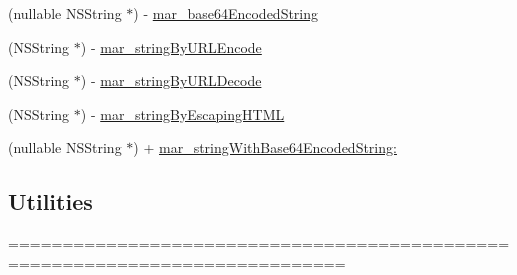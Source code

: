 \begin{DoxyCompactItemize}
\item 
(nullable N\+S\+String $\ast$) -\/ \hyperlink{category_n_s_string_07_m_a_r_e_x_08_ab6af857a6d843090e7fe95b5102111cb}{mar\+\_\+base64\+Encoded\+String}
\item 
(N\+S\+String $\ast$) -\/ \hyperlink{category_n_s_string_07_m_a_r_e_x_08_a6c03a4e04450369c3359a28e22e09019}{mar\+\_\+string\+By\+U\+R\+L\+Encode}
\item 
(N\+S\+String $\ast$) -\/ \hyperlink{category_n_s_string_07_m_a_r_e_x_08_a54f74a5a0d386689889a94d9f4155340}{mar\+\_\+string\+By\+U\+R\+L\+Decode}
\item 
(N\+S\+String $\ast$) -\/ \hyperlink{category_n_s_string_07_m_a_r_e_x_08_a894e446839545b15af7943299ec983d4}{mar\+\_\+string\+By\+Escaping\+H\+T\+ML}
\item 
(nullable N\+S\+String $\ast$) + \hyperlink{category_n_s_string_07_m_a_r_e_x_08_a2b59c6a57a5d14dbf9ac0f9d7b148e5c}{mar\+\_\+string\+With\+Base64\+Encoded\+String\+:}
\end{DoxyCompactItemize}
\subsection*{Utilities}
\label{_amgrpceba282b7418b7f199798b645e1cba56}%
============================================================================= 

